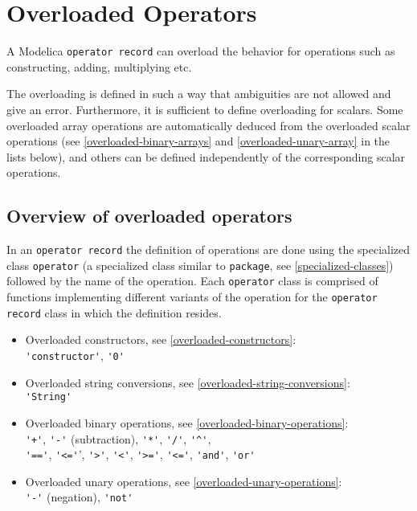 \chapter{Overloaded Operators}\label{overloaded-operators}

A Modelica \lstinline!operator record! can overload the behavior for operations such as constructing, adding, multiplying etc.

The overloading is defined in such a way that ambiguities are not allowed and give an error.
Furthermore, it is sufficient to define overloading for scalars.
Some overloaded array operations are automatically deduced from the overloaded scalar operations (see \cref{overloaded-binary-arrays} and \cref{overloaded-unary-array} in the lists below), and others can be defined independently of the corresponding scalar operations.

\section{Overview of overloaded operators}\label{overview-of-overloaded-operators}

In an \lstinline!operator record! the definition of operations are done using the specialized class \lstinline!operator! (a specialized class similar to \lstinline!package!, see \cref{specialized-classes}) followed by the name of the operation.
Each \lstinline!operator! class is comprised of functions implementing different variants of the operation for the \lstinline!operator record! class in which the definition resides.
%
\begin{itemize}
\item Overloaded constructors, see \cref{overloaded-constructors}:\\ \lstinline!'constructor'!, \lstinline!'0'!
\item Overloaded string conversions, see \cref{overloaded-string-conversions}:\\ \lstinline!'String'!
\item Overloaded binary operations, see \cref{overloaded-binary-operations}:\\
\lstinline!'+'!, \lstinline!'-'! (subtraction), \lstinline!'*'!, \lstinline!'/'!, \lstinline!'^'!,\\
 \lstinline!'=='!, \lstinline!'<='!', \lstinline!'>'!, \lstinline!'<'!,
\lstinline!'>='!, \lstinline!'<='!, \lstinline!'and'!, \lstinline!'or'!
\item Overloaded unary operations, see \cref{overloaded-unary-operations}:\\
\lstinline!'-'! (negation), \lstinline!'not'!
\end{itemize}

